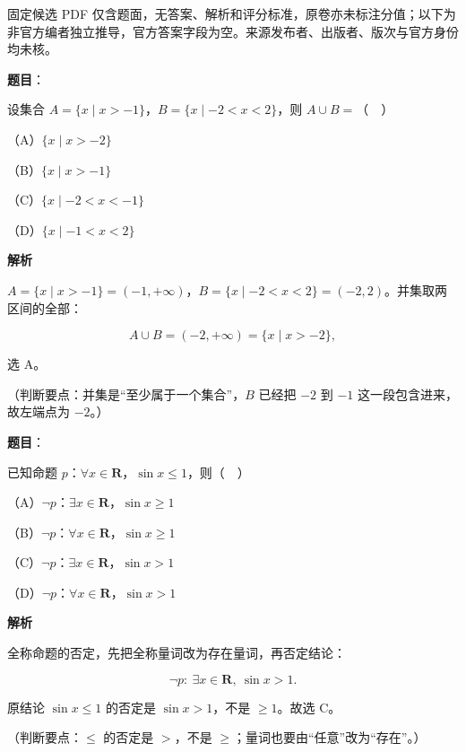 

\begin{gktip}
固定候选 PDF 仅含题面，无答案、解析和评分标准，原卷亦未标注分值；以下为非官方编者独立推导，官方答案字段为空。来源发布者、出版者、版次与官方身份均未核。
\end{gktip}

\begin{answer}

\textbf{题目}：

设集合 $A=\{x\mid x>-1\}$，$B=\{x\mid -2<x<2\}$，则 $A\cup B=$（　）

（A）$\{x\mid x>-2\}$

（B）$\{x\mid x>-1\}$

（C）$\{x\mid -2<x<-1\}$

（D）$\{x\mid -1<x<2\}$

\textbf{解析}

$A=\{x\mid x>-1\}=(-1,+\infty)$，$B=\{x\mid -2<x<2\}=(-2,2)$。并集取两区间的全部：

\nopagebreak[4]
\[A\cup B=(-2,+\infty)=\{x\mid x>-2\},\]

选 A。

（判断要点：并集是“至少属于一个集合”，$B$ 已经把 $-2$ 到 $-1$ 这一段包含进来，故左端点为 $-2$。）


\end{answer}
\begin{answer}

\textbf{题目}：

已知命题 $p$：$\forall x\in\mathbf R$，$\sin x\leqslant1$，则（　）

（A）$\neg p$：$\exists x\in\mathbf R$，$\sin x\geqslant1$

（B）$\neg p$：$\forall x\in\mathbf R$，$\sin x\geqslant1$

（C）$\neg p$：$\exists x\in\mathbf R$，$\sin x>1$

（D）$\neg p$：$\forall x\in\mathbf R$，$\sin x>1$

\textbf{解析}

全称命题的否定，先把全称量词改为存在量词，再否定结论：

\nopagebreak[4]
\[\neg p:\ \exists x\in\mathbf R,\ \sin x>1.\]

原结论 $\sin x\leqslant1$ 的否定是 $\sin x>1$，不是 $\geqslant1$。故选 C。

（判断要点：$\leqslant$ 的否定是 $>$，不是 $\geqslant$；量词也要由“任意”改为“存在”。）


\end{answer}
